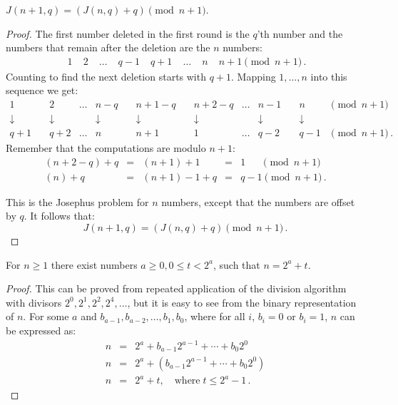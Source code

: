 \begin{theorem}\label{thm.jo1}
$J(n+1,q)=(J(n,q)+q) \pmod {n+1}$.
\end{theorem}

\begin{proof}
The first number deleted in the first round is the $q$'th number and the numbers that remain after the deletion are the $n$ numbers:
\[
\begin{array}{rrrrrrrr}
\;1&\;2&\;\ldots&\;q-1&\;q+1&\;\ldots&\;n&\;n+1 \pmod {n+1}\,.
\end{array}
\]
Counting to find the next deletion starts with $q+1$. Mapping $1,\ldots,n$ into this sequence we get:
\[
\begin{array}{cccccccccc}
1&\quad 2&\ldots& n-q&\quad n+1-q&\quad n+2-q&\ldots&n-1&\quad n& \!\!\!\!\!\!\pmod {n\!+\!1}\\
\downarrow&\quad \downarrow&&\downarrow&\quad \downarrow&\quad \downarrow&&\downarrow&\quad \downarrow\\
q+1&\quad q+2&\ldots&n&\quad n+1&\quad 1&\ldots&q-2&\quad q-1& \!\!\!\pmod {n\!+\!1}\,.
\end{array}
\]
Remember that the computations are modulo $n+1$:
\[
\begin{array}{lclcl}
(n+2-q)+q&=& (n+1)+1&=& 1 \quad\;\;\pmod {n+1}\\
(n)+q&= &(n+1)-1+q&= &q-1\pmod {n+1}\,.
\end{array}
\]

This is the Josephus problem for $n$ numbers, except that the numbers are offset by $q$. It follows that:
\[
J(n+1,q)=(J(n,q)+q) \pmod {n+1}\,.
\]
\end{proof}

\begin{theorem}\label{lem.jo}
For $n\geq 1$ there exist numbers $a\geq 0, 0\leq t < 2^a$, such that $n=2^a+t$.
\end{theorem}
\begin{proof}
This can be proved from repeated application of the division algorithm with divisors $2^0, 2^1, 2^2, 2^4,\ldots$, but it is easy to see from the binary representation of $n$. For some $a$ and $b_{a-1},b_{a-2},\ldots,b_{1},b_{0}$, where for all $i$, $b_i=0$ or $b_i=1$, $n$ can be expressed as:
\begin{eqnarray*}
n&=&2^a+b_{a-1}2^{a-1}+\cdots+b_{0}2^{0}\\
n&=&2^a+(b_{a-1}2^{a-1}+\cdots+b_{0}2^{0})\\
n&=&2^a+t,\quad \textrm{where}\; t\leq 2^a-1\,.
\end{eqnarray*}
\end{proof}


